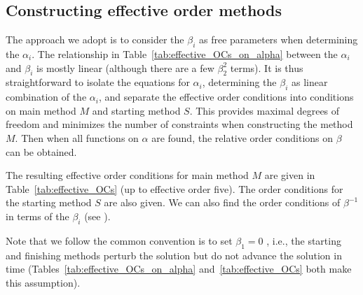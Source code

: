 \subsection{Constructing effective order methods}
The approach we adopt is to consider the $\beta_{i}$ as free
parameters when determining the $\alpha_i$.
The relationship in Table~\ref{tab:effective_OCs_on_alpha} between the
$\alpha_i$ and $\beta_i$ is mostly linear (although there are a few
$\beta_2^2$ terms).
It is thus straightforward to isolate the equations for $\alpha_i$,
determining the $\beta_i$ as linear combination of the $\alpha_i$, and
separate the effective order conditions into conditions on main method
$M$ and starting method $S$.
This provides maximal degrees of freedom and minimizes the number of
constraints when constructing the method $M$.
Then when all functions on $\alpha$ are found, the relative order
conditions on $\beta$ can be obtained.

The resulting effective order conditions for main method $M$ are given
in Table~\ref{tab:effective_OCs} (up to effective order five).
The order conditions for the starting method $S$ are also given.
We can also find the order conditions of $\beta^{-1}$ in terms of the
$\beta_i$ (see \cite[Table~386(III)]{Butcher2008_book}).

Note that we follow the common convention is to set $\beta_1=0$
\cite{Butcher2008_book}, i.e., the starting and finishing methods
perturb the solution but do not advance the solution in time
(Tables~\ref{tab:effective_OCs_on_alpha} and~\ref{tab:effective_OCs} both make
this assumption).

